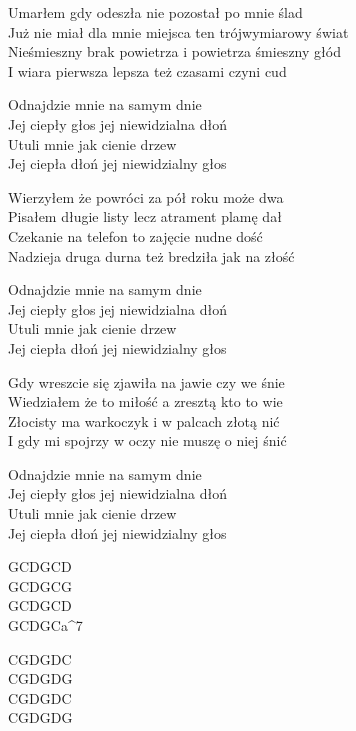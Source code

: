 \begin{text}
    Umarłem gdy odeszła nie pozostał po mnie ślad\\
    Już nie miał dla mnie miejsca ten trójwymiarowy świat\\
    Nieśmieszny brak powietrza i powietrza śmieszny głód\\
    I wiara pierwsza lepsza też czasami czyni cud

    Odnajdzie mnie na samym dnie\\
    Jej ciepły głos jej niewidzialna dłoń\\
    Utuli mnie jak cienie drzew\\
    Jej ciepła dłoń jej niewidzialny głos

    Wierzyłem że powróci za pół roku może dwa\\
    Pisałem długie listy lecz atrament plamę dał\\
    Czekanie na telefon to zajęcie nudne dość\\
    Nadzieja druga durna też bredziła jak na złość

    Odnajdzie mnie na samym dnie\\
    Jej ciepły głos jej niewidzialna dłoń\\
    Utuli mnie jak cienie drzew\\
    Jej ciepła dłoń jej niewidzialny głos

    Gdy wreszcie się zjawiła na jawie czy we śnie\\
    Wiedziałem że to miłość a zresztą kto to wie\\
    Złocisty ma warkoczyk i w palcach złotą nić\\
    I gdy mi spojrzy w oczy nie muszę o niej śnić

    Odnajdzie mnie na samym dnie\\
    Jej ciepły głos jej niewidzialna dłoń\\
    Utuli mnie jak cienie drzew\\
    Jej ciepła dłoń jej niewidzialny głos
\end{text}
\begin{chord}
    GCDGCD\\
    GCDGCG\\
    GCDGCD\\
    GCDGCa^7

    CGDGDC\\
    CGDGDG\\
    CGDGDC\\
    CGDGDG
\end{chord}